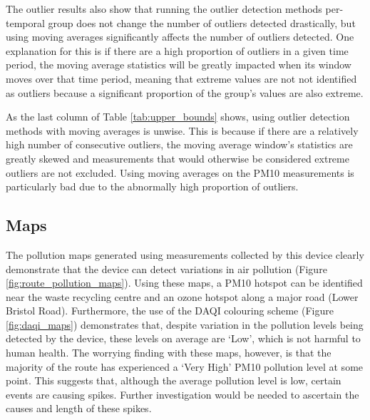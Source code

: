 \documentclass[11pt,twosided,a4paper]{report}
\begin{document}
The outlier results also show that running the outlier detection methods per-temporal group does not change the number of outliers detected drastically, but using moving averages significantly affects the number of outliers detected. One explanation for this is if there are a high proportion of outliers in a given time period, the moving average statistics will be greatly impacted when its window moves over that time period, meaning that extreme values are not not identified as outliers because a significant proportion of the group's values are also extreme.

As the last column of Table \ref{tab:upper_bounds} shows, using outlier detection methods with moving averages is unwise. This is because if there are a relatively high number of consecutive outliers, the moving average window's statistics are greatly skewed and measurements that would otherwise be considered extreme outliers are not excluded. Using moving averages on the PM10 measurements is particularly bad due to the abnormally high proportion of outliers.


\subsection{Maps}

The pollution maps generated using measurements collected by this device clearly demonstrate that the device can detect variations in air pollution (Figure \ref{fig:route_pollution_maps}).  Using these maps, a PM10 hotspot can be identified near the waste recycling centre and an ozone hotspot along a major road (Lower Bristol Road). Furthermore, the use of the DAQI colouring scheme (Figure \ref{fig:daqi_maps}) demonstrates that, despite variation in the pollution levels being detected by the device, these levels on average are `Low', which is not harmful to human health. The worrying finding with these maps, however, is that the majority of the route has experienced a `Very High' PM10 pollution level at some point. This suggests that, although the average pollution level is low, certain events are causing spikes. Further investigation would be needed to ascertain the causes and length of these spikes.
\end{document}
